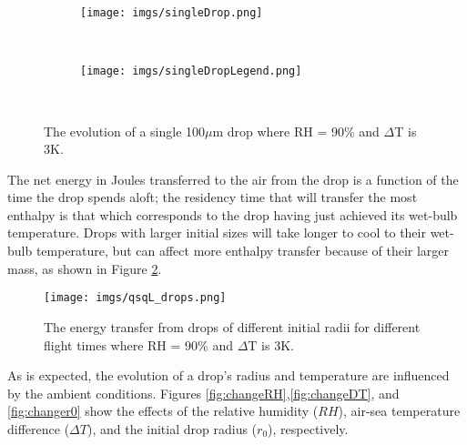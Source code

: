 \documentclass[10pt,a4paper]{article}
\begin{document}
\begin{figure}[h!]
    \centering
    \begin{subfigure}[t!]{0.75\textwidth}
        \texttt{[image: imgs/singleDrop.png]}        
    \end{subfigure}
    ~ %
    \begin{subfigure}[t!]{0.2\textwidth}
        \texttt{[image: imgs/singleDropLegend.png]}        
    \end{subfigure}
    ~ %
       \caption{The evolution of a single 100$\mu$m drop where RH = 90\% and $\Delta$T is 3K.  }
       \label{fig:singleDrop}
\end{figure}

The net energy in Joules transferred to the air from the drop is a function of the time the drop spends aloft; the residency time that will transfer the most enthalpy is that which corresponds to the drop having just achieved its wet-bulb temperature. Drops with larger initial sizes will take longer to cool to their wet-bulb temperature, but can affect more enthalpy transfer because of their larger mass, as shown in Figure \ref{fig:qsqL}. 

\begin{figure}[h!]
    \centering
        \texttt{[image: imgs/qsqL\_drops.png]}        
       \caption{The energy transfer from drops of different initial radii for different flight times where RH = 90\% and $\Delta$T is 3K. }
       \label{fig:qsqL}
\end{figure}

As is expected, the evolution of a drop's radius and temperature are influenced by the ambient conditions. Figures \ref{fig:changeRH},\ref{fig:changeDT}, and \ref{fig:changer0} show the effects of the relative humidity ($RH$), air-sea temperature difference ($\Delta T$), and the initial drop radius ($r_0$), respectively. 
\end{document}
